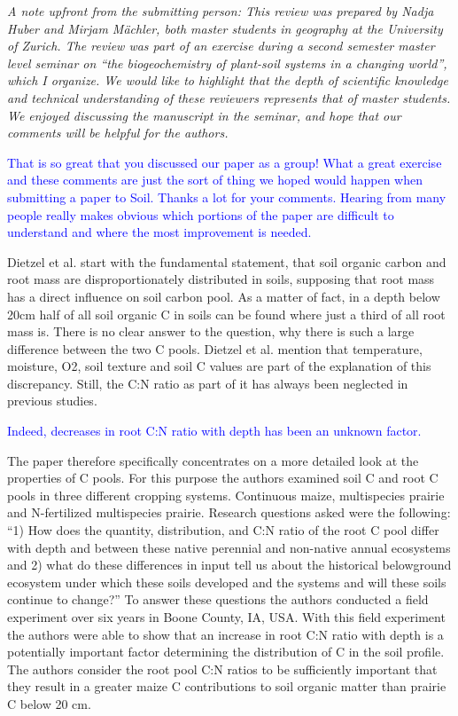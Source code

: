 \documentclass[]{article}
\begin{document}
\emph{A note upfront from the submitting person: This review was
prepared by Nadja Huber and Mirjam Mächler, both master students in
geography at the University of Zurich. The review was part of an
exercise during a second semester master level seminar on ``the
biogeochemistry of plant-soil systems in a changing world'', which I
organize. We would like to highlight that the depth of scientific
knowledge and technical understanding of these reviewers represents that
of master students. We enjoyed discussing the manuscript in the seminar,
and hope that our comments will be helpful for the authors.}

\textcolor{blue}{That is so great that you discussed our paper as a group! What a great exercise and these comments are just the sort of thing we hoped would happen when submitting a paper to Soil. Thanks a lot for your comments. Hearing from many people really makes obvious which portions of the paper are difficult to understand and where the most improvement is needed.}

Dietzel et al. start with the fundamental statement, that soil organic
carbon and root mass are disproportionately distributed in soils,
supposing that root mass has a direct influence on soil carbon pool. As
a matter of fact, in a depth below 20cm half of all soil organic C in
soils can be found where just a third of all root mass is. There is no
clear answer to the question, why there is such a large difference
between the two C pools. Dietzel et al. mention that temperature,
moisture, O2, soil texture and soil C values are part of the explanation
of this discrepancy. Still, the C:N ratio as part of it has always been
neglected in previous studies.

\textcolor{blue}{Indeed, decreases in root C:N ratio with depth has been an unknown factor.}

The paper therefore specifically concentrates on a more detailed look at
the properties of C pools. For this purpose the authors examined soil C
and root C pools in three different cropping systems. Continuous maize,
multispecies prairie and N-fertilized multispecies prairie. Research
questions asked were the following: ``1) How does the quantity,
distribution, and C:N ratio of the root C pool differ with depth and
between these native perennial and non-native annual ecosystems and 2)
what do these differences in input tell us about the historical
belowground ecosystem under which these soils developed and the systems
and will these soils continue to change?'' To answer these questions the
authors conducted a field experiment over six years in Boone County, IA,
USA. With this field experiment the authors were able to show that an
increase in root C:N ratio with depth is a potentially important factor
determining the distribution of C in the soil profile. The authors
consider the root pool C:N ratios to be sufficiently important that they
result in a greater maize C contributions to soil organic matter than
prairie C below 20 cm.
\end{document}
